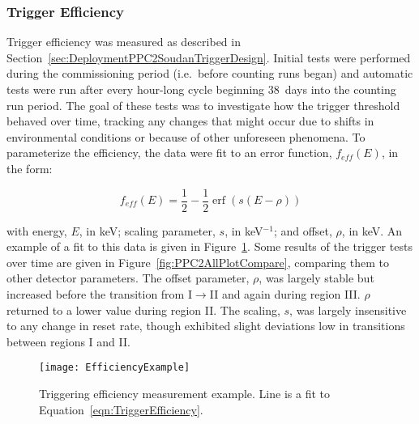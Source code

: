 		    	\subsubsection{Trigger Efficiency}
			\label{sec:DeploymentPPC2SoudanAnalysisTriggerEfficiency}    
			
	Trigger efficiency was measured as described in Section~\ref{sec:DeploymentPPC2SoudanTriggerDesign}.  Initial tests were performed during the commissioning period (i.e.~before counting runs began) and automatic tests were run after every hour-long cycle beginning 38~days into the counting run period.  The goal of these tests was to investigate how the trigger threshold behaved over time, tracking any changes that might occur due to shifts in environmental conditions or because of other unforeseen phenomena.  To parameterize the efficiency, the data were fit to an error function, $f_{eff}(E)$, in the form:

				\begin{equation}
					f_{eff}(E) = \frac{1}{2} - \frac{1}{2} \operatorname{erf} \left( s ( E-\rho ) \right)
					\label{eqn:TriggerEfficiency}
				\end{equation}
				
with energy, $E$, in keV; scaling parameter, $s$, in keV$^{-1}$; and offset, $\rho$, in keV.  An example of a fit to this data is given in Figure~\ref{fig:PPC2TriggeringEfficiencyExample}.  Some results of the trigger tests over time are given in Figure~\ref{fig:PPC2AllPlotCompare}, comparing them to other detector parameters.  The offset parameter, $\rho$, was largely stable but increased before the transition from I$\to$II and again during region III.  $\rho$ returned to a lower value during region II.  The scaling, $s$, was largely insensitive to any change in reset rate, though exhibited slight deviations low in transitions between regions I and II.  

				\begin{figure}
					\centering
					\texttt{[image: EfficiencyExample]}
					\caption[Triggering efficiency measurement example]
					{Triggering efficiency measurement example.  Line is a fit to 
					Equation~\ref{eqn:TriggerEfficiency}.}
					\label{fig:PPC2TriggeringEfficiencyExample}
				\end{figure}
	


